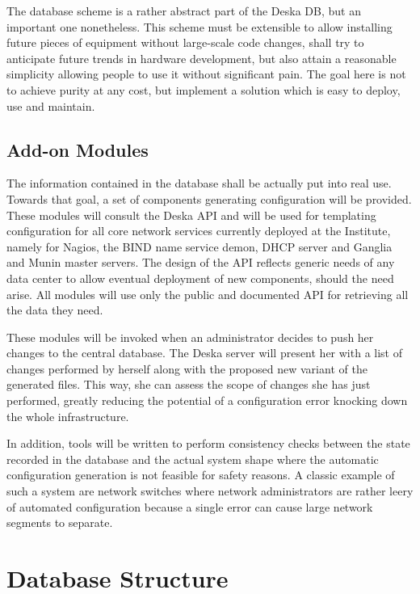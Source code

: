 \documentclass[a4paper]{jpconf}
\begin{document}
The database scheme is a rather abstract part of the Deska DB, but an important one nonetheless.  This scheme must be extensible to
allow installing future pieces of equipment without large-scale code changes, shall try to anticipate future trends in hardware
development, but also attain a reasonable simplicity allowing people to use it without significant pain.  The goal here is not to
achieve purity at any cost, but implement a solution which is easy to deploy, use and maintain.

\subsection{Add-on Modules}

The information contained in the database shall be actually put into real use.  Towards that goal, a set of components generating
configuration will be provided.  These modules will consult the Deska API and will be used for templating configuration for all core
network services currently deployed at the Institute, namely for Nagios, the BIND name service demon, DHCP server and Ganglia and Munin
master servers.  The design of the API reflects generic needs of any data center to allow eventual deployment of new components,
should the need arise.  All modules will use only the public and documented API for retrieving all the data they need.

These modules will be invoked when an administrator decides to push her changes to the central database.  The Deska server will
present her with a list of changes performed by herself along with the proposed new variant of the generated files.  This way, she can
assess the scope of changes she has just performed, greatly reducing the potential of a configuration error knocking down the whole
infrastructure.

In addition, tools will be written to perform consistency checks between the state recorded in the database and the actual system
shape where the automatic configuration generation is not feasible for safety reasons.  A classic example of such a system are network
switches where network administrators are rather leery of automated configuration because a single error can cause large network
segments to separate.

\section{Database Structure}
\end{document}
